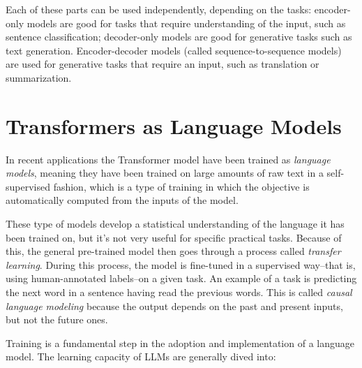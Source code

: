 Each of these parts can be used independently, depending on the tasks: encoder-only models are good for tasks that require understanding of the input, such as sentence classification; decoder-only models are good for generative tasks such as text generation.
Encoder-decoder models (called sequence-to-sequence models) are used for generative tasks that require an input, such as translation or summarization.




\section{Transformers as Language Models}
In recent applications the Transformer model have been trained as \textit{language models}, meaning they have been trained on large amounts of raw text in a self-supervised fashion, which is a type of training in which the objective is automatically computed from the inputs of the model.

These type of models develop a statistical understanding of the language it has been trained on, but it’s not very useful for specific practical tasks. Because of this, the general pre-trained model then goes through a process called \textit{transfer learning}. During this process, the model is fine-tuned in a supervised way--that is, using human-annotated labels--on a given task. An example of a task is predicting the next word in a sentence having read the previous words. This is called \textit{causal language modeling} because the output depends on the past and present inputs, but not the future ones.

Training is a fundamental step in the adoption and implementation of a language model. The learning capacity of LLMs are generally dived into: \cite{liu2024understanding}

